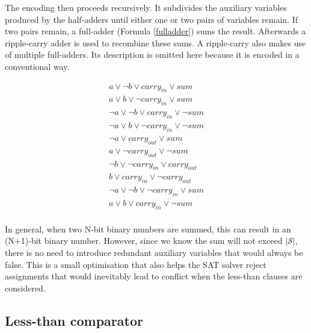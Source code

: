\documentclass{article}
\begin{document}
\noindent The encoding then proceeds recursively\cite{zhou2020yet}. It
subdivides the auxiliary variables produced by the half-adders until either one
or two pairs of variables remain. If two pairs remain, a full-adder (Formula
\ref{fulladder}) sums the result. Afterwards a ripple-carry adder is used to
recombine these sums. A ripple-carry also makes use of multiple full-adders.
Its description is omitted here because it is encoded in a conventional
way\cite{ripplecarry}.

\begin{equation}
  \label{fulladder}
  \begin{split}
    a \lor \neg{b} \lor \mathit{carry}_{\mathit{in}} \lor \mathit{sum} \\
    a \lor b \lor \neg{\mathit{carry}_{\mathit{in}}} \lor \mathit{sum} \\
    \neg{a} \lor \neg{b} \lor \mathit{carry}_{\mathit{in}} \lor \neg{\mathit{sum}} \\
    \neg{a} \lor b \lor \neg{\mathit{carry}_{\mathit{in}}} \lor \neg{\mathit{sum}} \\
    \neg{a} \lor \mathit{carry}_{\mathit{out}} \lor \mathit{sum} \\
    a \lor \neg{\mathit{carry}_{\mathit{out}}}\lor \neg{\mathit{sum}} \\
    \neg{b} \lor \neg{\mathit{carry}_{\mathit{in}}} \lor \mathit{carry}_{\mathit{out}} \\
    b \lor \mathit{carry}_{\mathit{in}} \lor \neg{\mathit{carry}_{\mathit{out}}} \\
    \neg{a} \lor \neg{b} \lor \neg{\mathit{carry}_{\mathit{in}}} \lor \mathit{sum} \\
    a \lor b \lor \mathit{carry}_{\mathit{in}} \lor \neg{\mathit{sum}} \\
  \end{split}
\end{equation}\break

\noindent In general, when two N-bit binary numbers are summed, this can result
in an (N+1)-bit binary number. However, since we know the sum will not exceed
$\vert \mathscr{S} \vert$, there is no need to introduce redundant auxiliary
variables that would always be false. This is a small optimisation that also
helps the SAT solver reject assignments that would inevitably lead to conflict
when the less-than clauses are considered.

\subsection{Less-than comparator}
\end{document}
